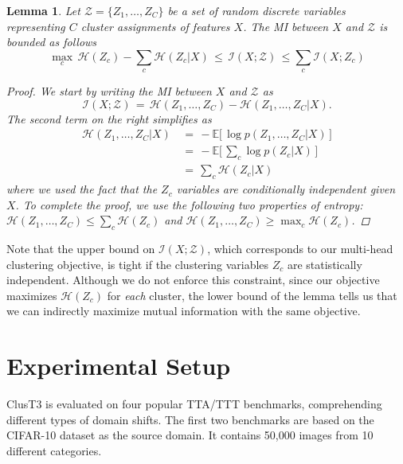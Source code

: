 \documentclass{article}
\newtheorem{lemma}[theorem]{Lemma}
\begin{document}
\begin{lemma}
Let $\mathcal{Z} = \{Z_1, \ldots, Z_C\}$ be a set of random discrete variables representing $C$ cluster assignments of features $X$. The MI between $X$ and $\mathcal{Z}$ is bounded as follows
\begin{equation}
\max_c \, \mathcal{H}(Z_c) - \sum_c \mathcal{H}(Z_c|X) \, \leq \, \mathcal{I}(X; \mathcal{Z}) \, \leq \sum_c \mathcal{I}(X; Z_c)\nonumber
\end{equation}
\begin{proof}
We start by writing the MI between $X$ and $\mathcal{Z}$ as
\begin{equation}
\mathcal{I}(X; \mathcal{Z}) \, = \, \mathcal{H}(Z_1, \ldots, Z_C) - \mathcal{H}(Z_1, \ldots, Z_C | X)\nonumber.
\end{equation}
The second term on the right simplifies as
\begin{align}
\mathcal{H}(Z_1, \ldots, Z_C | X) & \, = \, -\mathbb{E}\big[\, \log p(Z_1, \ldots, Z_C | X) \,\big] \nonumber\\
& \, = \, -\mathbb{E}\big[ \, \sum_c \log p(Z_c | X) \, \big] \nonumber\\
& \, = \, \sum_c \mathcal{H}(Z_c | X)\nonumber
\end{align}
where we used the fact that the $Z_c$ variables are conditionally independent given $X$. To complete the proof, we use the following two properties of entropy: $\mathcal{H}(Z_1,\ldots,Z_C) \leq \sum_c \mathcal{H}(Z_c)$ and $\mathcal{H}(Z_1,\ldots,Z_C) \geq \max_c \mathcal{H}(Z_c)$.
\end{proof}
\end{lemma}
Note that the upper bound on $\mathcal{I}(X; \mathcal{Z})$, which corresponds to our multi-head clustering objective, is tight if the clustering variables $Z_c$ are statistically independent. Although we do not enforce this constraint, since our objective maximizes $\mathcal{H}(Z_c)$ for \emph{each} cluster, the lower bound of the lemma tells us that we can indirectly maximize mutual information with the same objective.    

\section{Experimental Setup}
\label{sec:experiments}

ClusT3 is evaluated on four popular TTA/TTT benchmarks, comprehending different types of domain shifts.  The first two benchmarks are based on the CIFAR-10 dataset \cite{cifar10} as the source domain. It contains 50,000 images from 10 different categories. 
\end{document}
